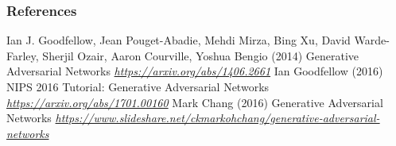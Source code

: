 %

%


\begin{vbframe}
\frametitle{References}
\footnotesize{
\begin{thebibliography}{99}
 Ian J. Goodfellow, Jean Pouget-Abadie, Mehdi Mirza, Bing Xu, David Warde-Farley, Sherjil Ozair, Aaron Courville, Yoshua Bengio (2014)
\newblock Generative Adversarial Networks
\newblock \emph{\url{https://arxiv.org/abs/1406.2661}}
 Ian Goodfellow (2016)
\newblock NIPS 2016 Tutorial: Generative Adversarial Networks
\newblock \emph{\url{https://arxiv.org/abs/1701.00160}}
 Mark Chang (2016)
\newblock Generative Adversarial Networks
\newblock \emph{\url{https://www.slideshare.net/ckmarkohchang/generative-adversarial-networks}}


\end{thebibliography}
}
\end{vbframe}

\endlecture
